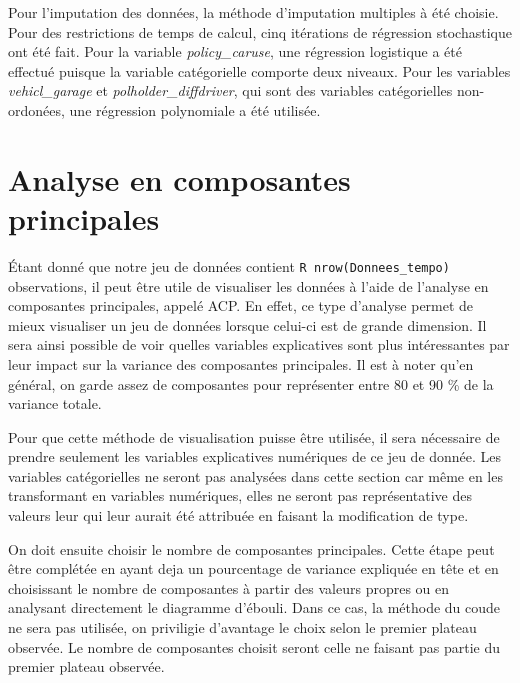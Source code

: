 \documentclass[
]{article}
\begin{document}
Pour l'imputation des données, la méthode d'imputation multiples à été
choisie. Pour des restrictions de temps de calcul, cinq itérations de
régression stochastique ont été fait. Pour la variable
\emph{policy\_caruse}, une régression logistique a été effectué puisque
la variable catégorielle comporte deux niveaux. Pour les variables
\emph{vehicl\_garage} et \emph{polholder\_diffdriver}, qui sont des
variables catégorielles non-ordonées, une régression polynomiale a été
utilisée.

\newpage

\hypertarget{analyse-en-composantes-principales}{%
\section{Analyse en composantes
principales}\label{analyse-en-composantes-principales}}

Étant donné que notre jeu de données contient
\texttt{R\ nrow(Donnees\_tempo)} observations, il peut être utile de
visualiser les données à l'aide de l'analyse en composantes principales,
appelé ACP. En effet, ce type d'analyse permet de mieux visualiser un
jeu de données lorsque celui-ci est de grande dimension. Il sera ainsi
possible de voir quelles variables explicatives sont plus intéressantes
par leur impact sur la variance des composantes principales. Il est à
noter qu'en général, on garde assez de composantes pour représenter
entre 80 et 90 \% de la variance totale.

Pour que cette méthode de visualisation puisse être utilisée, il sera
nécessaire de prendre seulement les variables explicatives numériques de
ce jeu de donnée. Les variables catégorielles ne seront pas analysées
dans cette section car même en les transformant en variables numériques,
elles ne seront pas représentative des valeurs leur qui leur aurait été
attribuée en faisant la modification de type.

On doit ensuite choisir le nombre de composantes principales. Cette
étape peut être complétée en ayant deja un pourcentage de variance
expliquée en tête et en choisissant le nombre de composantes à partir
des valeurs propres ou en analysant directement le diagramme d'ébouli.
Dans ce cas, la méthode du coude ne sera pas utilisée, on priviligie
d'avantage le choix selon le premier plateau observée. Le nombre de
composantes choisit seront celle ne faisant pas partie du premier
plateau observée.
\end{document}

